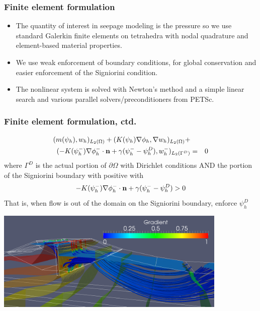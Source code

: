 \documentclass{beamer}
\begin{document}
\begin{frame}
  \frametitle{Finite element formulation}
  \begin{itemize}
  \item The quantity of interest in seepage modeling is the pressure
    so we use standard Galerkin finite elements on tetrahedra with
    nodal quadrature and element-based material properties.
  \item We use weak enforcement of boundary conditions, for global
    conservation and easier enforcement of the Signiorini condition.
  \item The nonlinear system is solved with Newton's method and a
    simple linear search and various parallel solvers/preconditioners
    from PETSc.
  \end{itemize}
\end{frame}

\begin{frame}
\frametitle{Finite element formulation, ctd.}
\begin{eqnarray}
  (m(\psi_h),w_h)_{L_2(\Omega)} + (K(\psi_h)\nabla \phi_h,\nabla w_h)_{L_2(\Omega)} + && \\
(-K(\psi_h^-) \nabla \phi_h^- \cdot {\bf n} + \gamma (\psi_h^- - \psi_h^D),w_h^-)_{L_2(\Gamma^D)} &=& 0
\end{eqnarray}
where $\Gamma^D$ is the actual portion of $\partial \Omega$ with
Dirichlet conditions AND the portion of the Signiorini boundary with
positive with
\begin{equation}
-K(\psi_h^-) \nabla \phi_h^- \cdot {\bf n} + \gamma (\psi_h^-  - \psi_h^D) > 0
\end{equation}
That is, when flow is out of the domain on the Signiorini boundary, enforce $\psi_h^D$
\end{frame}

\begin{frame}
\end{frame}

\begin{frame}
\includegraphics[width=4.35in]{pocketLevee_nopipe.png}
\end{frame}
\end{document}
